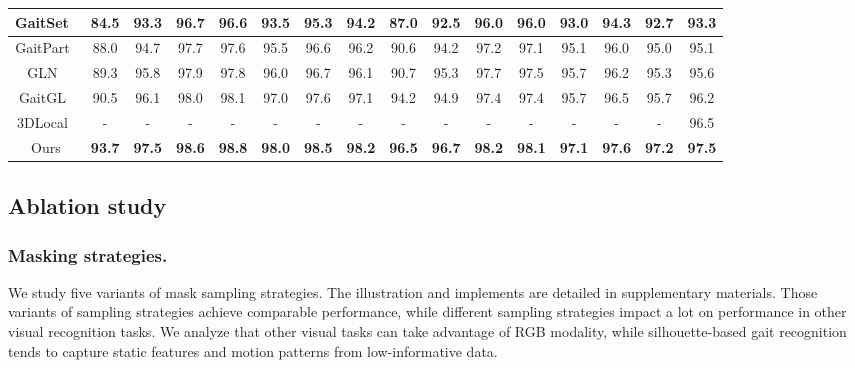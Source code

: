 \documentclass[runningheads]{llncs}
\begin{document}
\begin{table*}[htbp]
{\begin{tabular}{cc|c|c|c|c|c|c|c|c|c|c|c|c|c|c}
    \hline
    \multicolumn{1}{c|}{GaitSet~\cite{aaai2019gaitset}} & 84.5  & 93.3  & 96.7  & 96.6  & 93.5  & 95.3  & 94.2  & 87.0  & 92.5  & 96.0  & 96.0  & 93.0  & 94.3  & 92.7  & 93.3   \\
    \hline
    \multicolumn{1}{c|}{GaitPart~\cite{gaitpart}} & 88.0  & 94.7  & 97.7  & 97.6  & 95.5  & 96.6  & 96.2  & 90.6  & 94.2  & 97.2  & 97.1  & 95.1  & 96.0  & 95.0  & 95.1  \\
    \hline
    \multicolumn{1}{c|}{GLN~\cite{gln}}   & 89.3  & 95.8  & 97.9  & 97.8  & 96.0  & 96.7  & 96.1  & 90.7  & 95.3  & 97.7 & 97.5 & 95.7  & 96.2  & 95.3  & 95.6   \\
    \hline
    \multicolumn{1}{c|}{GaitGL~\cite{gaitgl}} & 90.5  & 96.1  & 98.0  & 98.1  & 97.0  & 97.6  & 97.1  & 94.2  & 94.9  & 97.4  & 97.4  & 95.7  & 96.5  & 95.7  & 96.2  \\
    \hline
    \multicolumn{1}{c|}{3DLocal~\cite{3dlocal}} & - & - & - & - & - & - & - & - & - & - & - & - & - & - & 96.5 \\
    \hline
    \multicolumn{1}{c|}{Ours} & \textbf{93.7} & \textbf{97.5} & \textbf{98.6} & \textbf{98.8} & \textbf{98.0} & \textbf{98.5} & \textbf{98.2} & \textbf{96.5} & \textbf{96.7} & \textbf{98.2} & \textbf{98.1} & \textbf{97.1} & \textbf{97.6} & \textbf{97.2} & \textbf{97.5} \\


    \bottomrule
    \end{tabular}}

  \label{comparision_oumvlp}\vspace*{-1em}
\end{table*}






\subsection{Ablation study}
\label{sec:ablation}


\subsubsection{Masking strategies.} We study five variants of mask sampling strategies. The illustration and implements are detailed in supplementary materials. Those variants of sampling strategies achieve comparable performance, while different sampling strategies impact a lot on performance in other visual recognition tasks. We analyze that other visual tasks can take advantage of RGB modality, while silhouette-based gait recognition tends to capture static features and motion patterns from low-informative data.
\end{document}

